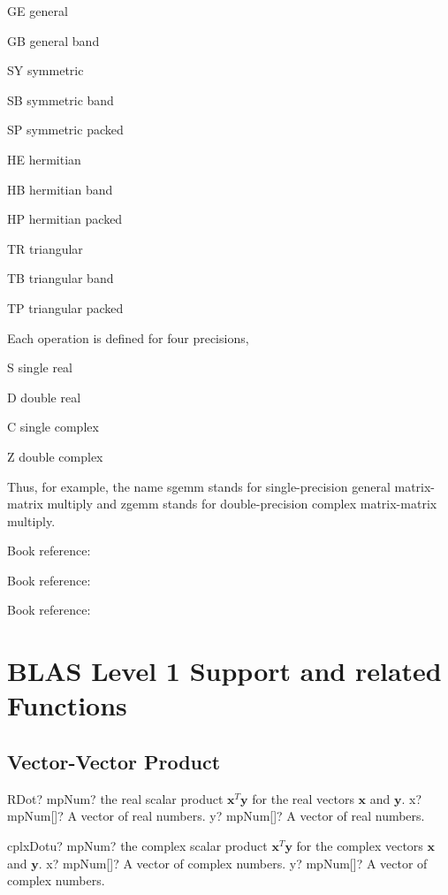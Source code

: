 GE general 

GB general band 

SY symmetric 

SB symmetric band 

SP symmetric packed 

HE hermitian 

HB hermitian band 

HP hermitian packed 

TR triangular 

TB triangular band 

TP triangular packed 

Each operation is defined for four precisions, 

S single real 

D double real 

C single complex 

Z double complex 

\vspace{0.3cm}
Thus, for example, the name sgemm stands for single-precision general matrix-matrix multiply and zgemm stands for double-precision complex matrix-matrix multiply.

Book reference: \cite{Golub1996}

Book reference: \cite{Bernstein_2009}

Book reference: \cite{Seber_2008}




\section{BLAS Level 1 Support and related Functions} 
\label{BLASSupportLevel1}

\subsection{Vector-Vector Product}

\begin{mpFunctionsExtract}
	\mpFunctionTwo
	{RDot? mpNum? the real scalar product $\boldsymbol{x}^T \boldsymbol{y}$ for the real vectors $\boldsymbol{x}$ and $\boldsymbol{y}$.}
	{x? mpNum[]? A vector of real numbers.}
	{y? mpNum[]? A vector of real numbers.}
\end{mpFunctionsExtract}

\vspace{0.6cm}
\begin{mpFunctionsExtract}
	\mpFunctionTwo
	{cplxDotu? mpNum? the complex  scalar product $\boldsymbol{x}^T \boldsymbol{y}$ for the complex  vectors $\boldsymbol{x}$ and $\boldsymbol{y}$.}
	{x? mpNum[]? A vector of complex numbers.}
	{y? mpNum[]? A vector of complex numbers.}
\end{mpFunctionsExtract}


